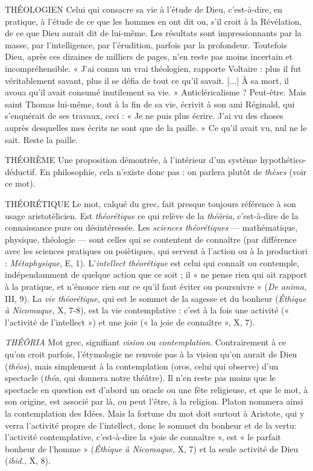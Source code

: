 THÉOLOGIEN Celui qui consacre sa vie à l’étude de Dieu, c’est-à-dire, en
pratique, à l'étude de ce que les hommes en ont dit ou, s’il
croit à la Révélation, de ce que Dieu aurait dit de lui-même. Les résultats sont
impressionnants par la masse, par l'intelligence, par l’érudition, parfois par la
profondeur. Toutefois Dieu, après ces dizaines de milliers de pages, n’en reste
pas moins incertain et incompréhensible. « J’ai connu un vrai théologien, rapporte
Voltaire : plus il fut véritablement savant, plus il se défia de tout ce qu'il
savait. [...] À sa mort, il avoua qu’il avait consumé inutilement sa vie. »
Anticléricalisme ? Peut-être. Mais saint Thomas lui-même, tout à la fin de sa
vie, écrivit à son ami Réginald, qui s’enquérait de ses travaux, ceci : « Je ne puis
plus écrire. J'ai vu des choses auprès desquelles mes écrits ne sont que de la
paille. » Ce qu’il avait vu, nul ne le sait. Reste la paille.

THÉORÈME Une proposition démontrée, à l’intérieur d’un système hypothético-déductif.
En philosophie, cela n’existe donc pas : on
parlera plutôt de {\it thèses} (voir ce mot).

THÉORÉTIQUE Le mot, calqué du grec, fait presque toujours référence à
son usage aristotélicien. Est {\it théorétique} ce qui relève de la
{\it théôria}, c’est-à-dire de la connaissance pure ou désintéressée. Les {\it sciences théorétiques}
— mathématique, physique, théologie — sont celles qui se contentent de
connaître (par différence avec les sciences pratiques ou poiètiques, qui servent
à l’action ou à la productiori : {\it Métaphysique}, E, 1). L’{\it intellect théorétique} est
celui qui connaît ou contemple, indépendamment de quelque action que ce
soit ; il « ne pense rien qui ait rapport à la pratique, et n’énonce rien sur ce qu’il
faut éviter ou poursuivre » ({\it De anima}, III, 9). La {\it vie théorétique}, qui est le
sommet de la sagesse et du bonheur ({\it Éthique à Nicomaque}, X, 7-8), est la vie
contemplative : c’est à la fois une activité (« l’activité de l’intellect ») et une joie
(« la joie de connaître », X, 7).

{\it THÉÔRIA} Mot grec, signifiant {\it vision} ou {\it contemplation}. Contrairement à ce
qu’on croit parfois, l’étymologie ne renvoie pas à la vision qu’on
aurait de Dieu ({\it théos}), mais simplement à la contemplation (oros, celui qui
observe) d’un spectacle ({\it théa}, qui donnera notre théâtre). Il n’en reste pas
moins que le spectacle en question est d’abord un oracle ou une fête religieuse,
et que le mot, à son origine, est associé par là, ou peut l'être, à la religion.
Platon nommera ainsi la contemplation des Idées. Mais la fortune du mot doit
surtout à Aristote, qui y verra l’activité propre de l’intellect, donc le sommet du
bonheur et de la vertu: l’activité contemplative, c’est-à-dire la «joie de
connaître », est « le parfait bonheur de l’homme » ({\it Éthique à Nicomaque}, X, 7)
et la seule activité de Dieu ({\it ibid.}, X, 8).

